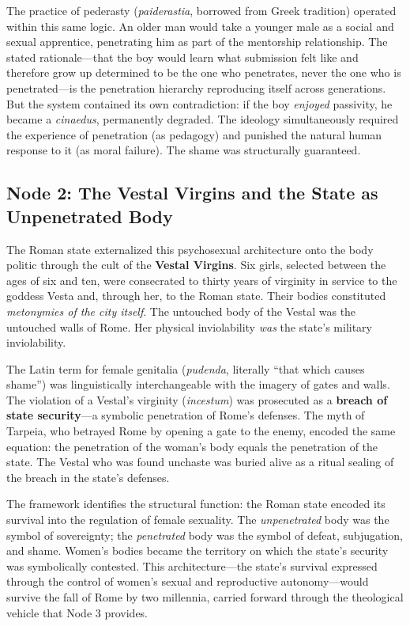 The practice of pederasty (\textit{paiderastia}, borrowed from Greek tradition) operated within this same logic. An older man would take a younger male as a social and sexual apprentice, penetrating him as part of the mentorship relationship. The stated rationale---that the boy would learn what submission felt like and therefore grow up determined to be the one who penetrates, never the one who is penetrated---is the penetration hierarchy reproducing itself across generations. But the system contained its own contradiction: if the boy \textit{enjoyed} passivity, he became a \textit{cinaedus}, permanently degraded. The ideology simultaneously required the experience of penetration (as pedagogy) and punished the natural human response to it (as moral failure). The shame was structurally guaranteed.

\subsection{Node 2: The Vestal Virgins and the State as Unpenetrated Body}

The Roman state externalized this psychosexual architecture onto the body politic through the cult of the \textbf{Vestal Virgins}. Six girls, selected between the ages of six and ten, were consecrated to thirty years of virginity in service to the goddess Vesta and, through her, to the Roman state. Their bodies constituted \textit{metonymies of the city itself}. The untouched body of the Vestal was the untouched walls of Rome. Her physical inviolability \textit{was} the state's military inviolability.

The Latin term for female genitalia (\textit{pudenda}, literally ``that which causes shame'') was linguistically interchangeable with the imagery of gates and walls. The violation of a Vestal's virginity (\textit{incestum}) was prosecuted as a \textbf{breach of state security}---a symbolic penetration of Rome's defenses. The myth of Tarpeia, who betrayed Rome by opening a gate to the enemy, encoded the same equation: the penetration of the woman's body equals the penetration of the state. The Vestal who was found unchaste was buried alive as a ritual sealing of the breach in the state's defenses.

The framework identifies the structural function: the Roman state encoded its survival into the regulation of female sexuality. The \textit{unpenetrated} body was the symbol of sovereignty; the \textit{penetrated} body was the symbol of defeat, subjugation, and shame. Women's bodies became the territory on which the state's security was symbolically contested. This architecture---the state's survival expressed through the control of women's sexual and reproductive autonomy---would survive the fall of Rome by two millennia, carried forward through the theological vehicle that Node 3 provides.

